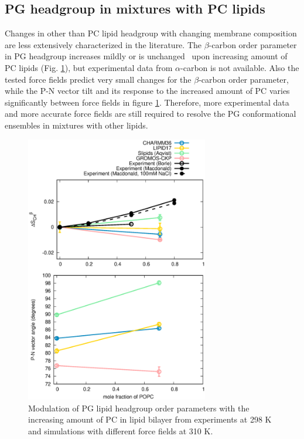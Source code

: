 \documentclass[journal=jpcbfk]{achemso}
\begin{document}
\subsection{PG headgroup in mixtures with PC lipids}
Changes in other than PC lipid headgroup with changing membrane composition are less
extensively characterized in the literature.
The $\beta$-carbon order parameter in PG headgroup increases
mildly \cite{macdonald87} or is unchanged~\cite{borle85} upon increasing amount
of PC lipids (Fig. \ref{HGorderparametersPGvsPCchange}), but experimental data from
$\alpha$-carbon is not available. Also the tested force fields predict very small changes
for the $\beta$-carbon order parameter, while the P-N vector tilt and its response to the
increased amount of PC varies significantly between force fields in figure \ref{HGorderparametersPGvsPCchange}. 
Therefore, more experimental data and more accurate force fields are still required
to resolve the PG conformational ensembles in mixtures with other lipids.
\begin{figure}[]
  \centering
  \includegraphics[width=8.0cm]{./Figs/HGorderparametersPGvsPCchange.eps}
  \caption{\label{HGorderparametersPGvsPCchange}
    Modulation of PG lipid headgroup order parameters with the increasing amount of PC in lipid bilayer
    from experiments at 298 K \cite{borle85,macdonald87} and simulations with different force fields at 310 K.
  }
\end{figure}
\end{document}
